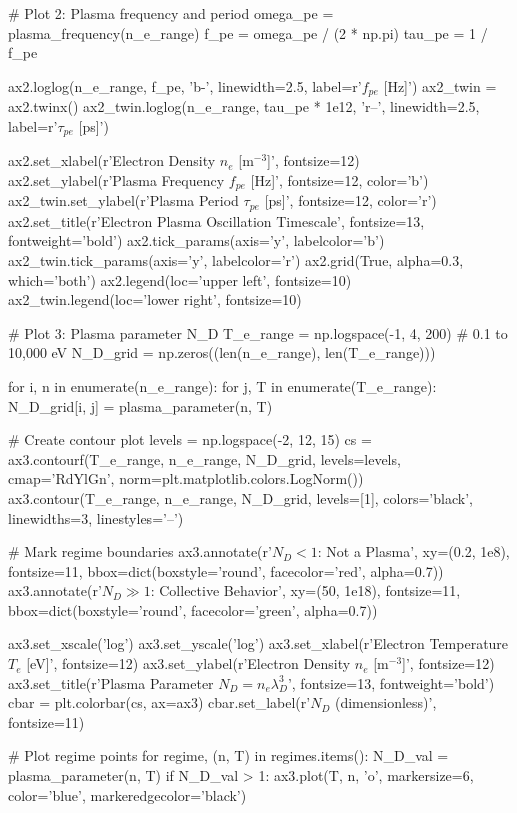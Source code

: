\documentclass[11pt,a4paper]{article}
\begin{document}
\begin{pycode}
# Plot 2: Plasma frequency and period
omega_pe = plasma_frequency(n_e_range)
f_pe = omega_pe / (2 * np.pi)
tau_pe = 1 / f_pe

ax2.loglog(n_e_range, f_pe, 'b-', linewidth=2.5, label=r'$f_{pe}$ [Hz]')
ax2_twin = ax2.twinx()
ax2_twin.loglog(n_e_range, tau_pe * 1e12, 'r--', linewidth=2.5, label=r'$\tau_{pe}$ [ps]')

ax2.set_xlabel(r'Electron Density $n_e$ [m$^{-3}$]', fontsize=12)
ax2.set_ylabel(r'Plasma Frequency $f_{pe}$ [Hz]', fontsize=12, color='b')
ax2_twin.set_ylabel(r'Plasma Period $\tau_{pe}$ [ps]', fontsize=12, color='r')
ax2.set_title(r'Electron Plasma Oscillation Timescale', fontsize=13, fontweight='bold')
ax2.tick_params(axis='y', labelcolor='b')
ax2_twin.tick_params(axis='y', labelcolor='r')
ax2.grid(True, alpha=0.3, which='both')
ax2.legend(loc='upper left', fontsize=10)
ax2_twin.legend(loc='lower right', fontsize=10)

# Plot 3: Plasma parameter N_D
T_e_range = np.logspace(-1, 4, 200)  # 0.1 to 10,000 eV
N_D_grid = np.zeros((len(n_e_range), len(T_e_range)))

for i, n in enumerate(n_e_range):
    for j, T in enumerate(T_e_range):
        N_D_grid[i, j] = plasma_parameter(n, T)

# Create contour plot
levels = np.logspace(-2, 12, 15)
cs = ax3.contourf(T_e_range, n_e_range, N_D_grid, levels=levels,
                  cmap='RdYlGn', norm=plt.matplotlib.colors.LogNorm())
ax3.contour(T_e_range, n_e_range, N_D_grid, levels=[1], colors='black',
            linewidths=3, linestyles='--')

# Mark regime boundaries
ax3.annotate(r'$N_D < 1$: Not a Plasma', xy=(0.2, 1e8), fontsize=11,
            bbox=dict(boxstyle='round', facecolor='red', alpha=0.7))
ax3.annotate(r'$N_D \gg 1$: Collective Behavior', xy=(50, 1e18), fontsize=11,
            bbox=dict(boxstyle='round', facecolor='green', alpha=0.7))

ax3.set_xscale('log')
ax3.set_yscale('log')
ax3.set_xlabel(r'Electron Temperature $T_e$ [eV]', fontsize=12)
ax3.set_ylabel(r'Electron Density $n_e$ [m$^{-3}$]', fontsize=12)
ax3.set_title(r'Plasma Parameter $N_D = n_e \lambda_D^3$', fontsize=13, fontweight='bold')
cbar = plt.colorbar(cs, ax=ax3)
cbar.set_label(r'$N_D$ (dimensionless)', fontsize=11)

# Plot regime points
for regime, (n, T) in regimes.items():
    N_D_val = plasma_parameter(n, T)
    if N_D_val > 1:
        ax3.plot(T, n, 'o', markersize=6, color='blue', markeredgecolor='black')


\end{pycode}
\end{document}
